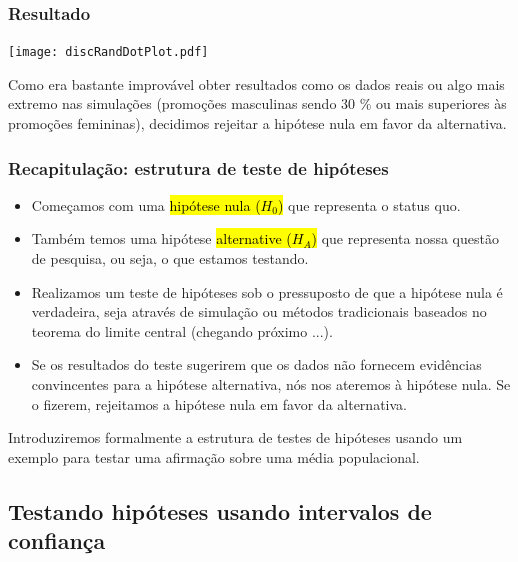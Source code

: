 \documentclass[11pt]{beamer}
\begin{document}

\begin{frame}
\frametitle{Resultado}

\begin{center}
\texttt{[image: discRandDotPlot.pdf]}
\end{center}

\pause

Como era bastante improvável obter resultados como os dados reais ou algo mais extremo nas simulações (promoções masculinas sendo 30 \% ou mais superiores às promoções femininas), decidimos rejeitar a hipótese nula em favor da alternativa.

\end{frame}


\begin{frame}
\frametitle{Recapitulação: estrutura de teste de hipóteses}

\begin{itemize}
\item Começamos com uma \hl{hipótese nula ($ H_0 $)} que representa o status quo.
\pause
\item Também temos uma hipótese \hl{alternative ($ H_A $)} que representa nossa questão de pesquisa, ou seja, o que estamos testando.
\pause
\item Realizamos um teste de hipóteses sob o pressuposto de que a hipótese nula é verdadeira, seja através de simulação ou métodos tradicionais baseados no teorema do limite central (chegando próximo ...).
\pause
\item Se os resultados do teste sugerirem que os dados não fornecem evidências convincentes para a hipótese alternativa, nós nos ateremos à hipótese nula. Se o fizerem, rejeitamos a hipótese nula em favor da alternativa.
\end{itemize}
\pause
Introduziremos formalmente a estrutura de testes de hipóteses usando um exemplo para testar uma afirmação sobre uma média populacional.

\end{frame}


\subsection{Testando hipóteses usando intervalos de confiança} 

\end{document}
